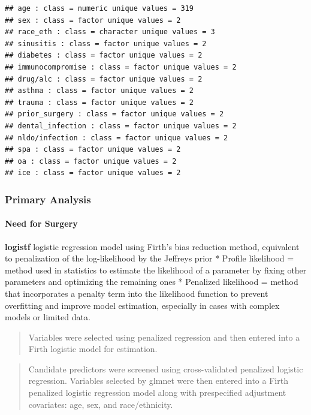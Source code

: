 \documentclass[
]{article}
\begin{document}
\begin{verbatim}
## age : class = numeric unique values = 319 
## sex : class = factor unique values = 2 
## race_eth : class = character unique values = 3 
## sinusitis : class = factor unique values = 2 
## diabetes : class = factor unique values = 2 
## immunocompromise : class = factor unique values = 2 
## drug/alc : class = factor unique values = 2 
## asthma : class = factor unique values = 2 
## trauma : class = factor unique values = 2 
## prior_surgery : class = factor unique values = 2 
## dental_infection : class = factor unique values = 2 
## nldo/infection : class = factor unique values = 2 
## spa : class = factor unique values = 2 
## oa : class = factor unique values = 2 
## ice : class = factor unique values = 2
\end{verbatim}

\subsubsection{Primary Analysis}\label{primary-analysis}

\paragraph{Need for Surgery}\label{need-for-surgery}

\textbf{logistf}
logistic regression model using Firth's bias reduction method, equivalent to
penalization of the log-likelihood by the Jeffreys prior
* Profile likelihood = method used in statistics to estimate the likelihood
of a parameter by fixing other parameters and optimizing the remaining ones
* Penalized likelihood = method that incorporates a penalty term into the
likelihood function to prevent overfitting and improve model estimation,
especially in cases with complex models or limited data.

\begin{quote}
Variables were selected using penalized regression and then entered into a
Firth logistic model for estimation.
\end{quote}

\begin{quote}
Candidate predictors were screened using cross-validated penalized logistic
regression. Variables selected by glmnet were then entered into a Firth penalized
logistic regression model along with prespecified adjustment covariates: age,
sex, and race/ethnicity.
\end{quote}
\end{document}

